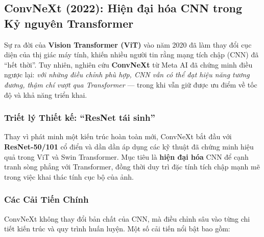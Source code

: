\subsection{ConvNeXt (2022): Hiện đại hóa CNN trong Kỷ nguyên Transformer}
\label{subsec:convnext}
Sự ra đời của \textbf{Vision Transformer (ViT)} vào năm 2020 đã làm thay đổi cục diện của thị giác máy tính, khiến nhiều người tin rằng mạng tích chập (CNN) đã “hết thời”. Tuy nhiên, nghiên cứu \textbf{ConvNeXt} \cite{Liu2022} từ Meta AI đã chứng minh điều ngược lại: \textit{với những điều chỉnh phù hợp, CNN vẫn có thể đạt hiệu năng tương đương, thậm chí vượt qua Transformer} — trong khi vẫn giữ được ưu điểm về tốc độ và khả năng triển khai.

\subsubsection{Triết lý Thiết kế: “ResNet tái sinh”}
Thay vì phát minh một kiến trúc hoàn toàn mới, ConvNeXt bắt đầu với \textbf{ResNet-50/101} cổ điển và dần dần áp dụng các kỹ thuật đã chứng minh hiệu quả trong ViT và Swin Transformer.  
Mục tiêu là \textbf{hiện đại hóa} CNN để cạnh tranh sòng phẳng với Transformer, đồng thời duy trì đặc tính tích chập mạnh mẽ trong việc khai thác tính cục bộ của ảnh.

\subsubsection{Các Cải Tiến Chính}
ConvNeXt không thay đổi bản chất của CNN, mà điều chỉnh sâu vào từng chi tiết kiến trúc và quy trình huấn luyện. Một số cải tiến nổi bật bao gồm:

